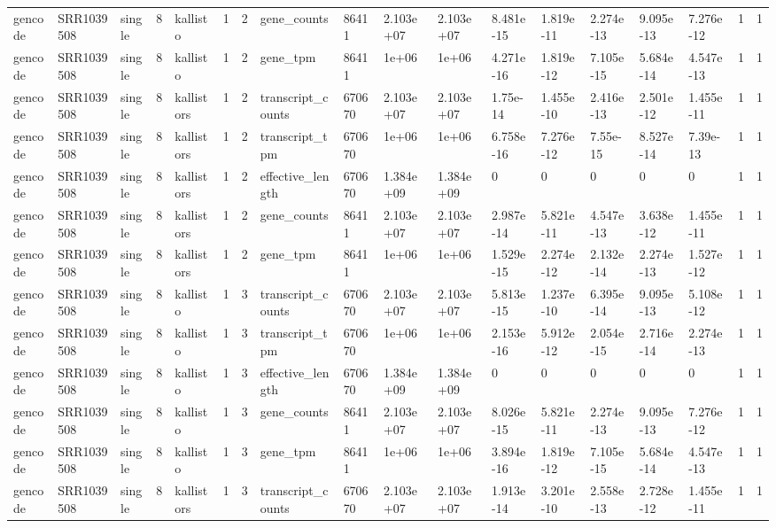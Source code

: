 \begin{tabular}{llllllllllllllllll}
gencode & SRR1039508 & single & 8 & kallisto & 1 & 2 & gene\_counts & 86411 & 2.103e+07 & 2.103e+07 & 8.481e-15 & 1.819e-11 & 2.274e-13 & 9.095e-13 & 7.276e-12 & 1 & 1 \\
gencode & SRR1039508 & single & 8 & kallisto & 1 & 2 & gene\_tpm & 86411 & 1e+06 & 1e+06 & 4.271e-16 & 1.819e-12 & 7.105e-15 & 5.684e-14 & 4.547e-13 & 1 & 1 \\
gencode & SRR1039508 & single & 8 & kallistors & 1 & 2 & transcript\_counts & 670670 & 2.103e+07 & 2.103e+07 & 1.75e-14 & 1.455e-10 & 2.416e-13 & 2.501e-12 & 1.455e-11 & 1 & 1 \\
gencode & SRR1039508 & single & 8 & kallistors & 1 & 2 & transcript\_tpm & 670670 & 1e+06 & 1e+06 & 6.758e-16 & 7.276e-12 & 7.55e-15 & 8.527e-14 & 7.39e-13 & 1 & 1 \\
gencode & SRR1039508 & single & 8 & kallistors & 1 & 2 & effective\_length & 670670 & 1.384e+09 & 1.384e+09 & 0 & 0 & 0 & 0 & 0 & 1 & 1 \\
gencode & SRR1039508 & single & 8 & kallistors & 1 & 2 & gene\_counts & 86411 & 2.103e+07 & 2.103e+07 & 2.987e-14 & 5.821e-11 & 4.547e-13 & 3.638e-12 & 1.455e-11 & 1 & 1 \\
gencode & SRR1039508 & single & 8 & kallistors & 1 & 2 & gene\_tpm & 86411 & 1e+06 & 1e+06 & 1.529e-15 & 2.274e-12 & 2.132e-14 & 2.274e-13 & 1.527e-12 & 1 & 1 \\
gencode & SRR1039508 & single & 8 & kallisto & 1 & 3 & transcript\_counts & 670670 & 2.103e+07 & 2.103e+07 & 5.813e-15 & 1.237e-10 & 6.395e-14 & 9.095e-13 & 5.108e-12 & 1 & 1 \\
gencode & SRR1039508 & single & 8 & kallisto & 1 & 3 & transcript\_tpm & 670670 & 1e+06 & 1e+06 & 2.153e-16 & 5.912e-12 & 2.054e-15 & 2.716e-14 & 2.274e-13 & 1 & 1 \\
gencode & SRR1039508 & single & 8 & kallisto & 1 & 3 & effective\_length & 670670 & 1.384e+09 & 1.384e+09 & 0 & 0 & 0 & 0 & 0 & 1 & 1 \\
gencode & SRR1039508 & single & 8 & kallisto & 1 & 3 & gene\_counts & 86411 & 2.103e+07 & 2.103e+07 & 8.026e-15 & 5.821e-11 & 2.274e-13 & 9.095e-13 & 7.276e-12 & 1 & 1 \\
gencode & SRR1039508 & single & 8 & kallisto & 1 & 3 & gene\_tpm & 86411 & 1e+06 & 1e+06 & 3.894e-16 & 1.819e-12 & 7.105e-15 & 5.684e-14 & 4.547e-13 & 1 & 1 \\
gencode & SRR1039508 & single & 8 & kallistors & 1 & 3 & transcript\_counts & 670670 & 2.103e+07 & 2.103e+07 & 1.913e-14 & 3.201e-10 & 2.558e-13 & 2.728e-12 & 1.455e-11 & 1 & 1 \\

\end{tabular}

